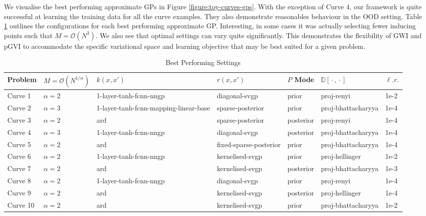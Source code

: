 \documentclass{article}
\newcommand{\wc}{\operatorname{{}\cdot{}}}
\numberwithin{equation}{section}
\begin{document}
We visualise the best performing approximate GPs in Figure \ref{figure:toy-curves-gps}. With the exception of Curve 4, our framework is quite successful at learning the training data for all the curve examples.
They also demonstrate reasonables behaviour in the OOD setting. 
Table \ref{table:toy-curve-configs} outlines the configurations for each best performing approximate GP. 
Interesting, in some cases it was actually selecting fewer inducing points such that $M = \mathcal{O}(N^3)$.
We also see that optimal settings can vary quite significantly.
This demonstrates the flexibility of GWI and pGVI to accommodate the specific variational space and learning objective that may be best suited for a given problem.

\begin{table}[h!]
\tiny
\centering
\begin{tabular}{lllllll}
\toprule
Problem &  $M = \mathcal{O}(N^{1/\alpha})$  &                      $k(x, x')$ &       $r(x, x')$ & $P$ Mode &   $\mathbb{D}[\wc, \wc]$ &  $\ell. r.$ \\
\midrule
 Curve 1  &                       $\alpha=2$ &                1-layer-tanh-fcnn-nngp &          diagonal-svgp &          prior &         proj-renyi &      1e-2 \\
 Curve 2  &                       $\alpha=3$ & 1-layer-tanh-fcnn-mapping-linear-base &       sparse-posterior &          prior & proj-bhattacharyya &      1e-4 \\
 Curve 3  &                       $\alpha=2$ &                                  ard &       sparse-posterior &      posterior &         proj-renyi &      1e-4 \\
 Curve 4  &                       $\alpha=3$ &                1-layer-tanh-fcnn-nngp &          diagonal-svgp &      posterior & proj-bhattacharyya &      1e-4 \\
 Curve 5  &                       $\alpha=2$ &                                  ard & fixed-sparse-posterior &          prior & proj-bhattacharyya &      1e-4 \\
 Curve 6  &                       $\alpha=2$ &                1-layer-tanh-fcnn-nngp &        kernelised-svgp &          prior &     proj-hellinger &      1e-2 \\
 Curve 7  &                       $\alpha=2$ &                                  ard &        kernelised-svgp &      posterior & proj-bhattacharyya &      1e-3 \\
 Curve 8  &                       $\alpha=2$ &                1-layer-tanh-fcnn-nngp &          diagonal-svgp &          prior &         proj-renyi &      1e-4 \\
 Curve 9  &                       $\alpha=2$ &                                  ard &        kernelised-svgp &      posterior &     proj-hellinger &      1e-4 \\
 Curve 10 &                       $\alpha=2$ &                                  ard &        kernelised-svgp &          prior & proj-bhattacharyya &      1e-2 \\
\bottomrule
\end{tabular}
\caption{Best Performing Settings}
\label{table:toy-curve-configs}
\end{table}
\end{document}
